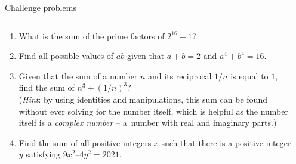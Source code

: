 \documentclass[9pt,aspectratio=169]{beamer}
\begin{document}
\begin{frame}{Challenge problems}
  \begin{columns}[T]
    \begin{column}{0.5\textwidth}
      \begin{enumerate}
        \item What is the sum of the prime factors of  $2^{16} - 1$?
        \item Find all possible values of $ab$ given that $a+ b = 2$ and $a^4 + b^4 = 16$. 
        \item Given that the sum of a number $n$ and its reciprocal $1/n$ is equal to $1$, find the sum of $n^3 + (1/n)^3$? \\
        (\emph{Hint}: by using identities and manipulations, this sum can be found without ever solving for the number itself, which is helpful as the number itself is a \emph{complex number} – a~number with real and imaginary parts.)
        \item Find the sum of all positive integers $x$ such that there is a positive integer $y$ satisfying $9x^2 – 4y^2 = 2021$.
      \end{enumerate}
    \end{column}
    \begin{column}{0.5\textwidth}
    \end{column}
  \end{columns}
\end{frame}

\end{document}
